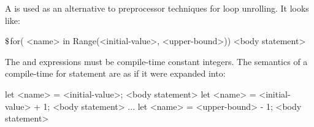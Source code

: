 
A  is used as an alternative to preprocessor techniques for loop unrolling.
It looks like:

\begin{codeblock}
$\mbox{\textdollar}$for( <name> in Range(<initial-value>, <upper-bound>)) <body statement>
\end{codeblock}

The  and  expressions must be compile-time constant integers.
The semantics of a compile-time for statement are as if it were expanded into:

\begin{codeblock}
{
	let <name> = <initial-value>;
	<body statement>
}
{
	let <name> = <initial-value> + 1;
	<body statement>
}
...
{
	let <name> = <upper-bound> - 1;
	<body statement>
}
\end{codeblock}
